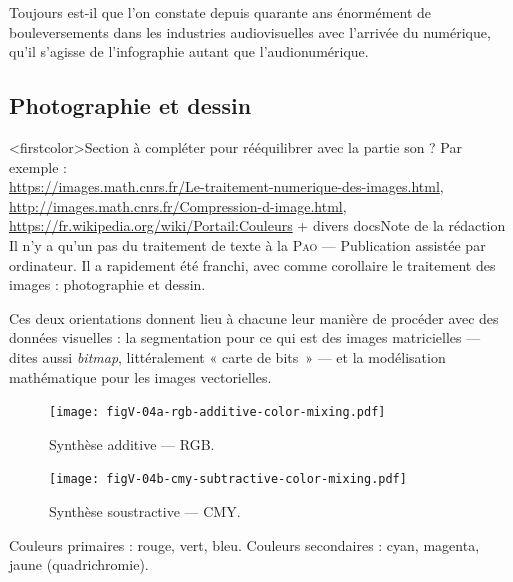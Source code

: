 Toujours est-il que l'on constate depuis quarante ans énormément de bouleversements dans les industries audiovisuelles avec l'arrivée du numérique, qu'il s'agisse de l'infographie autant que l'audionumérique.


\subsection[Photographie et dessin]{Photographie et dessin}
\label{sub:V.2.1}

\caution[t]<firstcolor>{Section à compléter pour rééquilibrer avec la partie son ? Par exemple :\\ \url{https://images.math.cnrs.fr/Le-traitement-numerique-des-images.html}, \url{http://images.math.cnrs.fr/Compression-d-image.html}, \url{https://fr.wikipedia.org/wiki/Portail:Couleurs} + divers docs}{Note de la rédaction}%
Il n'y a qu'un pas du traitement de texte à la \textsc{Pao} --- Publication assistée par ordinateur. Il a rapidement été franchi, avec comme corollaire le traitement des images : photographie et dessin. 

Ces deux orientations donnent lieu à chacune leur manière de procéder avec des données visuelles : la segmentation pour ce qui est des images matricielles --- dites aussi \textit{bitmap}, littéralement « carte de bits~» --- et la modélisation mathématique pour les images vectorielles.

\begin{marginfigure}%
\begin{subfigure}{\linewidth}
\texttt{[image: figV-04a-rgb-additive-color-mixing.pdf]}
\caption{\label{fig:V.4a}Synthèse additive --- RGB.}
\end{subfigure}
\begin{subfigure}{\linewidth}
\vspace{4pt}
\texttt{[image: figV-04b-cmy-subtractive-color-mixing.pdf]}
\caption{\label{fig:V.4b}Synthèse soustractive --- CMY.}
\end{subfigure}
\vspace{-2pt}
\caption{\label{fig:V.4}Couleurs primaires : rouge, vert, bleu. Couleurs secondaires : cyan, magenta, jaune (quadrichromie).}
\end{marginfigure}

